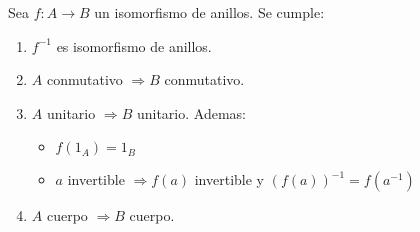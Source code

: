 \begin{proposition}
	Sea \(f \colon A \to B \) un isomorfismo de anillos. Se cumple:
	\begin{enumerate}
		\item \(f^{-1} \) es isomorfismo de anillos.
		\item \(A \) conmutativo \(\Rightarrow B \) conmutativo.
		\item \(A \) unitario \(\Rightarrow B \) unitario. Ademas: \begin{itemize}
			      \item \(f(1_A) = 1_B \)
			      \item \(a \) invertible \(\Rightarrow f(a )\) invertible y \((f(a))^{-1} = f(a^{-1} )\)
		      \end{itemize}
		\item \(A \) cuerpo \(\Rightarrow B \) cuerpo.
	\end{enumerate}
\end{proposition}

